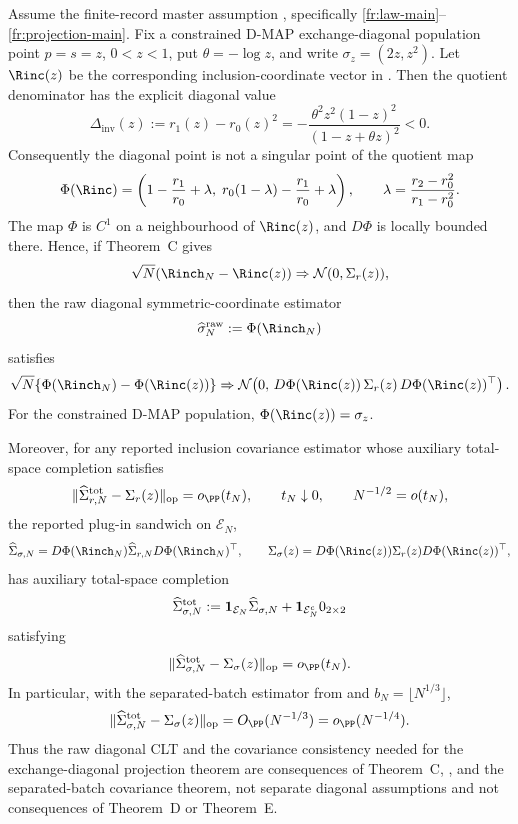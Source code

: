 \begin{lemma}\label{lem:dmap-diagonal-raw-quotient-clt-main}
Assume the finite-record master assumption
, specifically
\ref{fr:law-main}--\ref{fr:projection-main}.  Fix a constrained D-MAP
exchange-diagonal population point \(p=s=z\), \(0<z<1\), put
\(\theta=-\log z\), and write \(\sigma_z=(2z,z^2)\).  Let \(\Rinc(z)\) be the
corresponding inclusion-coordinate vector in
.  Then the quotient denominator
has the explicit diagonal value
\begin{equation}\label{eq:diagonal-quotient-denominator-main}
\Delta_{\mathrm{inv}}(z):=r_1(z)-r_0(z)^2
=-\frac{\theta^2z^2(1-z)^2}{(1-z+\theta z)^2}<0 .
\end{equation}
Consequently the diagonal point is not a singular point of the quotient map
\[
\Phi(\Rinc)=\left(1-\frac{r_1}{r_0}+\lambda,\;
r_0(1-\lambda)-\frac{r_1}{r_0}+\lambda\right),
\qquad
\lambda=\frac{r_2-r_0^2}{r_1-r_0^2}.
\]
The map \(\Phi\) is \(C^1\) on a neighbourhood of \(\Rinc(z)\), and \(D\Phi\) is
locally bounded there.  Hence, if Theorem~C gives
\[
\sqrt N(\Rinch_N-\Rinc(z))\Rightarrow
\mathcal N(0,\Sigma_r(z)),
\]
then the raw diagonal symmetric-coordinate estimator
\[
\widehat\sigma_N^{\rm raw}:=\Phi(\Rinch_N)
\]
satisfies
\begin{equation}\label{eq:diagonal-raw-quotient-clt-main}
\sqrt N\{\Phi(\Rinch_N)-\Phi(\Rinc(z))\}
\Rightarrow
\mathcal N\!\left(0,\,
D\Phi(\Rinc(z))\,\Sigma_r(z)\,D\Phi(\Rinc(z))^\top\right).
\end{equation}
For the constrained D-MAP population, \(\Phi(\Rinc(z))=\sigma_z\).

Moreover, for any reported inclusion covariance estimator whose auxiliary
total-space completion satisfies
\[
\|\widehat\Sigma_{r,N}^{\rm tot}-\Sigma_r(z)\|_{\operatorname{op}}=o_{\PP}(t_N),
\qquad t_N\downarrow0,\qquad N^{-1/2}=o(t_N),
\]
the reported plug-in sandwich on \(\mathcal E_N\),
\[
\widehat\Sigma_{\sigma,N}
=D\Phi(\Rinch_N)\widehat\Sigma_{r,N}D\Phi(\Rinch_N)^\top,\qquad
\Sigma_\sigma(z)=D\Phi(\Rinc(z))\Sigma_r(z)D\Phi(\Rinc(z))^\top,
\]
has auxiliary total-space completion
\[
\widehat\Sigma_{\sigma,N}^{\rm tot}
:=\mathbf 1_{\mathcal E_N}\widehat\Sigma_{\sigma,N}
+\mathbf 1_{\mathcal E_N^c}0_{2\times2}
\]
satisfying
\begin{equation}\label{eq:diagonal-sandwich-consistency-main}
\|\widehat\Sigma_{\sigma,N}^{\rm tot}-\Sigma_\sigma(z)\|_{\operatorname{op}}
=o_{\PP}(t_N).
\end{equation}
In particular, with the separated-batch estimator from
 and \(b_N=\lfloor N^{1/3}\rfloor\),
\[
\|\widehat\Sigma_{\sigma,N}^{\rm tot}-\Sigma_\sigma(z)\|_{\operatorname{op}}
=O_{\PP}(N^{-1/3})=o_{\PP}(N^{-1/4}).
\]
Thus the raw diagonal CLT and the covariance consistency needed for the
exchange-diagonal projection theorem are consequences of Theorem~C,
, and the separated-batch
covariance theorem, not separate diagonal assumptions and not consequences of
Theorem~D or Theorem~E.
\end{lemma}

